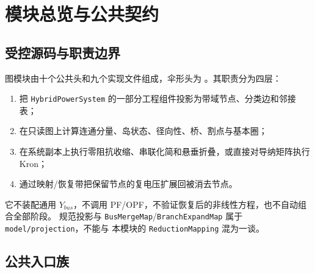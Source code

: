 
\section{模块总览与公共契约}\label{sec:gr-overview}

\subsection{受控源码与职责边界}

图模块由十个公共头和九个实现文件组成，伞形头为
。其职责分为四层：
\begin{enumerate}
  \item 把 \texttt{HybridPowerSystem} 的一部分工程组件投影为带域节点、分类边和邻接表；
  \item 在只读图上计算连通分量、岛状态、径向性、桥、割点与基本圈；
  \item 在系统副本上执行零阻抗收缩、串联化简和悬垂折叠，或直接对导纳矩阵执行 Kron；
  \item 通过映射/恢复带把保留节点的复电压扩展回被消去节点。
\end{enumerate}
它不装配通用 $Y_{bus}$，不调用 PF/OPF，不验证恢复后的非线性方程，也不自动组合全部阶段。
规范投影与 \texttt{BusMergeMap}/\texttt{BranchExpandMap} 属于 \texttt{model/projection}，不能与
本模块的 \texttt{ReductionMapping} 混为一谈。

\subsection{公共入口族}

